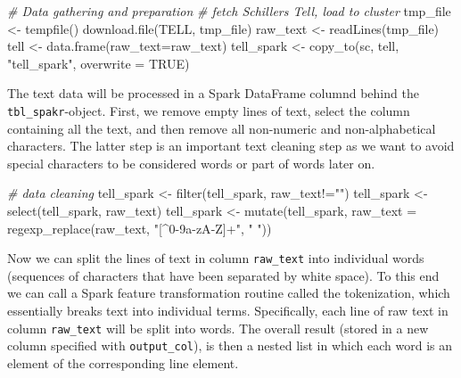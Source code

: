 \documentclass[
  12pt,
]{style/krantz}
\newenvironment{Shaded}{\begin{snugshade}}{\end{snugshade}}
\newcommand{\AttributeTok}[1]{\textcolor[rgb]{0.77,0.63,0.00}{#1}}
\newcommand{\CommentTok}[1]{\textcolor[rgb]{0.56,0.35,0.01}{\textit{#1}}}
\newcommand{\ConstantTok}[1]{\textcolor[rgb]{0.00,0.00,0.00}{#1}}
\newcommand{\FunctionTok}[1]{\textcolor[rgb]{0.00,0.00,0.00}{#1}}
\newcommand{\NormalTok}[1]{#1}
\newcommand{\OtherTok}[1]{\textcolor[rgb]{0.56,0.35,0.01}{#1}}
\newcommand{\SpecialCharTok}[1]{\textcolor[rgb]{0.00,0.00,0.00}{#1}}
\newcommand{\StringTok}[1]{\textcolor[rgb]{0.31,0.60,0.02}{#1}}
\begin{document}
\begin{Shaded}
\begin{Highlighting}[]
\CommentTok{\# Data gathering and preparation}
\CommentTok{\# fetch Schiller\textquotesingle{}s Tell, load to cluster}
\NormalTok{tmp\_file }\OtherTok{\textless{}{-}} \FunctionTok{tempfile}\NormalTok{()}
\FunctionTok{download.file}\NormalTok{(TELL, tmp\_file)}
\NormalTok{raw\_text }\OtherTok{\textless{}{-}} \FunctionTok{readLines}\NormalTok{(tmp\_file)}
\NormalTok{tell }\OtherTok{\textless{}{-}} \FunctionTok{data.frame}\NormalTok{(}\AttributeTok{raw\_text=}\NormalTok{raw\_text)}
\NormalTok{tell\_spark }\OtherTok{\textless{}{-}} \FunctionTok{copy\_to}\NormalTok{(sc, tell, }\StringTok{"tell\_spark"}\NormalTok{, }\AttributeTok{overwrite =} \ConstantTok{TRUE}\NormalTok{)}
\end{Highlighting}
\end{Shaded}

The text data will be processed in a Spark DataFrame columnd behind the \texttt{tbl\_spakr}-object. First, we remove empty lines of text, select the column containing all the text, and then remove all non-numeric and non-alphabetical characters. The latter step is an important text cleaning step as we want to avoid special characters to be considered words or part of words later on.

\begin{Shaded}
\begin{Highlighting}[]
\CommentTok{\# data cleaning}
\NormalTok{tell\_spark }\OtherTok{\textless{}{-}} \FunctionTok{filter}\NormalTok{(tell\_spark, raw\_text}\SpecialCharTok{!=}\StringTok{""}\NormalTok{)}
\NormalTok{tell\_spark }\OtherTok{\textless{}{-}} \FunctionTok{select}\NormalTok{(tell\_spark, raw\_text)}
\NormalTok{tell\_spark }\OtherTok{\textless{}{-}} \FunctionTok{mutate}\NormalTok{(tell\_spark, }
                     \AttributeTok{raw\_text =} \FunctionTok{regexp\_replace}\NormalTok{(raw\_text, }\StringTok{"[\^{}0{-}9a{-}zA{-}Z]+"}\NormalTok{, }\StringTok{" "}\NormalTok{))}
\end{Highlighting}
\end{Shaded}

Now we can split the lines of text in column \texttt{raw\_text} into individual words (sequences of characters that have been separated by white space). To this end we can call a Spark feature transformation routine called the tokenization, which essentially breaks text into individual terms. Specifically, each line of raw text in column \texttt{raw\_text} will be split into words. The overall result (stored in a new column specified with \texttt{output\_col}), is then a nested list in which each word is an element of the corresponding line element.
\end{document}
